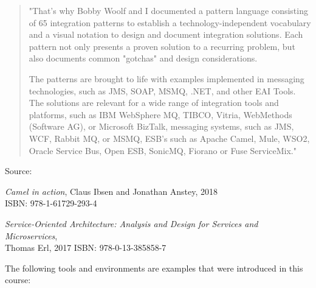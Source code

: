 \documentclass[Screen16to9,17pt]{foils}
\begin{document}
\begin{quote}
"That's why Bobby Woolf and I documented a pattern language consisting of 65 integration patterns to establish a technology-independent vocabulary and a visual notation to design and document integration solutions. Each pattern not only presents a proven solution to a recurring problem, but also documents common "gotchas" and design considerations.

The patterns are brought to life with examples implemented in messaging technologies, such as JMS, SOAP, MSMQ, .NET, and other EAI Tools. The solutions are relevant for a wide range of integration tools and platforms, such as IBM WebSphere MQ, TIBCO, Vitria, WebMethods (Software AG), or Microsoft BizTalk, messaging systems, such as JMS, WCF, Rabbit MQ, or MSMQ, ESB's such as Apache Camel, Mule, WSO2, Oracle Service Bus, Open ESB, SonicMQ, Fiorano or Fuse ServiceMix."
\end{quote}

Source:\\



\emph{Camel in action}, Claus Ibsen and Jonathan Anstey, 2018\\
ISBN: 978-1-61729-293-4



\emph{Service‑Oriented Architecture: Analysis and Design for Services and Microservices},\\ Thomas Erl, 2017
ISBN: 978-0-13-385858-7



The following tools and environments are examples that were introduced in this course:
\end{document}
